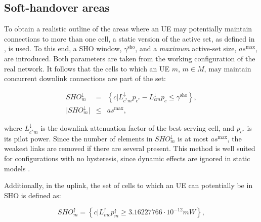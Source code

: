 \subsection{Soft-handover areas \label{sub:07-SHO_areas}}

To obtain a realistic outline of the areas where an UE may potentially
maintain connections to more than one cell, a static version of the
active set, as defined in \cite{nawrocki2006understanding}, is used.
To this end, a SHO window, $\gamma^{\mathrm{sho}}$,
and a \textit{\emph{maximum}} active-set size, $as^{\mathrm{max}}$,
are introduced. Both parameters are taken from the working configuration
of the real network. It follows that the cells to which an UE $m$,
$m\in M$, may maintain concurrent downlink connections are part of
the set:

\begin{eqnarray}
SHO_{m}^{\downarrow} & = & \left\{ c\vert L_{c^{*}m}^{\downarrow}p_{c^{*}}-L_{cm}^{\downarrow}p_{c}\le\gamma^{\mathrm{sho}}\right\} ,\label{eq:sho_dl}\\
\vert SHO_{m}^{\downarrow}\vert & \le & as^{\mathrm{max}},\nonumber 
\end{eqnarray}



\noindent where $L_{c^{*}m}^{\downarrow}$ is the downlink attenuation
factor of the best-serving cell, and $p_{c^{*}}$ is its pilot power.
Since the number of elements in $SHO_{m}^{\downarrow}$ is at most
$as^{\mathrm{max}}$, the weakest links are removed if there are several
present. This method is well suited for configurations with no hysteresis,
since dynamic effects are ignored in static models \cite{nawrocki2006understanding}. 

Additionally, in the uplink, the set of cells to which an UE can potentially
be in SHO is defined as:

\begin{equation}
SHO_{m}^{\uparrow}=\left\{ c\vert L_{mc}^{\uparrow}p_{m}^{\uparrow}\ge3.16227766\cdot10^{-12}mW\right\} ,
\end{equation}



